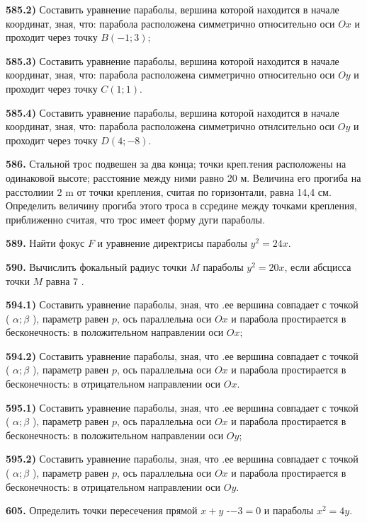\textbf{585.2)} Составить уравнение параболы, вершина которой находится в начале координат, зная, что: парабола расположена симметрично относительно оси $O x$ и проходит через точку $B(-1 ; 3)$;

\textbf{585.3)} Составить уравнение параболы, вершина которой находится в начале координат, зная, что: парабола расположена симметрично относительно оси $O y$ и проходит через точку $C(1 ; 1)$.

\textbf{585.4)} Составить уравнение параболы, вершина которой находится в начале координат, зная, что: парабола расположена симметрично отнлсительно оси $O y$ и проходит через точку $D(4 ;-8)$.

\textbf{586.} Стальной трос подвешен за два конца; точки креп.тения расположены на одинаковой высоте; расстояние между ними равно 20 м. Величина его прогиба на расстолиии 2 m от точки крепления, считая по горизонтали, равна 14,4 см. Определить величину прогиба этого троса в ссредине между точками крепления, приближенно считая, что трос имеет форму дуги параболы.

\textbf{589.} Найти фокус $F$ и уравнение директрисы параболы $y^2=24 x$.

\textbf{590.} Вычислить фокальный радиус точки $M$ параболы $y^2=20 x$, если абсцисса точки $M$ равна 7 .

\textbf{594.1)} Составить уравнение параболы, зная, что .ее вершина совпадает с точкой ( $\alpha ; \beta$ ), параметр равен $p$, ось параллельна оси $O x$ и парабола простирается в бесконечность: в положительном направлении оси $O x$;

\textbf{594.2)} Составить уравнение параболы, зная, что .ее вершина совпадает с точкой ( $\alpha ; \beta$ ), параметр равен $p$, ось параллельна оси $O x$ и парабола простирается в бесконечность: в отрицательном направлении оси $O x$.

\textbf{595.1)} Составить уравнение параболы, зная, что .ее вершина совпадает с точкой ( $\alpha ; \beta$ ), параметр равен $p$, ось параллельна оси $O x$ и парабола простирается в бесконечность: в положительном направлении оси $O y$;

\textbf{595.2)} Составить уравнение параболы, зная, что .ее вершина совпадает с точкой ( $\alpha ; \beta$ ), параметр равен $p$, ось параллельна оси $O x$ и парабола простирается в бесконечность: в отрицательном направлении оси $O y$.

\textbf{605.} Определить точки пересечения прямой $x+y$ -$-3=0$ и параболы $x^2=4 y$.

